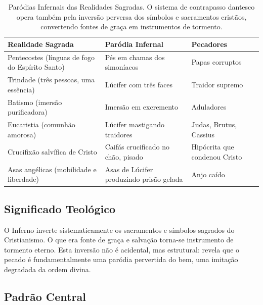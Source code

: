 \begin{table}[ht]
  \centering
  \small
  \renewcommand{\arraystretch}{1.3}
  \caption*{Paródias Infernais das Realidades Sagradas. O sistema de contrapasso dantesco opera também pela inversão perversa dos símbolos e sacramentos cristãos, convertendo fontes de graça em instrumentos de tormento.}
  \begin{tabularx}{\textwidth}{|>{\raggedright\arraybackslash}p{4.5cm}|>{\raggedright\arraybackslash}p{5.5cm}|>{\raggedright\arraybackslash}X|}
    \hline
    \textbf{Realidade Sagrada} & \textbf{Paródia Infernal} & \textbf{Pecadores} \\
    \hline
    Pentecostes (línguas de fogo do Espírito Santo) & Pés em chamas dos simoníacos & Papas corruptos \\
    \hline
    Trindade (três pessoas, uma essência) & Lúcifer com três faces & Traidor supremo \\
    \hline
    Batismo (imersão purificadora) & Imersão em excremento & Aduladores \\
    \hline
    Eucaristia (comunhão amorosa) & Lúcifer mastigando traidores & Judas, Brutus, Cassius \\
    \hline
    Crucifixão salvífica de Cristo & Caifás crucificado no chão, pisado & Hipócrita que condenou Cristo \\
    \hline
    Asas angélicas (mobilidade e liberdade) & Asas de Lúcifer produzindo prisão gelada & Anjo caído \\
    \hline
  \end{tabularx}
\end{table}

\subsection{Significado Teológico}

O Inferno inverte sistematicamente os sacramentos e símbolos sagrados do Cristianismo. O que era fonte de graça e salvação torna-se instrumento de tormento eterno. Esta inversão não é acidental, mas estrutural: revela que o pecado é fundamentalmente uma paródia pervertida do bem, uma imitação degradada da ordem divina.


\subsection{Padrão Central}

